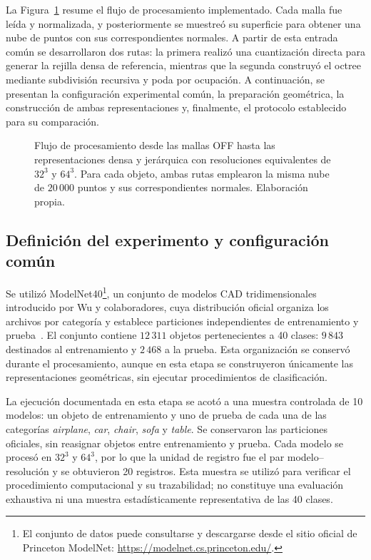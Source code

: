 La Figura~\ref{fig:flujo} resume el flujo de procesamiento implementado. Cada malla fue leída y normalizada, y posteriormente se muestreó su superficie para obtener una nube de puntos con sus correspondientes normales. A partir de esta entrada común se desarrollaron dos rutas: la primera realizó una cuantización directa para generar la rejilla densa de referencia, mientras que la segunda construyó el octree mediante subdivisión recursiva y poda por ocupación. A continuación, se presentan la configuración experimental común, la preparación geométrica, la construcción de ambas representaciones y, finalmente, el protocolo establecido para su comparación.

\begin{figure}[H]\centering
{}
\caption{Flujo de procesamiento desde las mallas OFF hasta las representaciones densa y jerárquica con resoluciones equivalentes de $32^3$ y $64^3$. Para cada objeto, ambas rutas emplearon la misma nube de $20\,000$ puntos y sus correspondientes normales. Elaboración propia.}
\label{fig:flujo}
\end{figure}

\subsection{Definición del experimento y configuración común}
\label{subsec:experimento-inicial}

Se utilizó ModelNet40\footnote{El conjunto de datos puede consultarse y descargarse desde el sitio oficial de Princeton ModelNet: \url{https://modelnet.cs.princeton.edu/}.}, un conjunto de modelos CAD tridimensionales introducido por Wu y colaboradores, cuya distribución oficial organiza los archivos por categoría y establece particiones independientes de entrenamiento y prueba~\parencite{wu2015}. El conjunto contiene $12\,311$ objetos pertenecientes a 40 clases: $9\,843$ destinados al entrenamiento y $2\,468$ a la prueba. Esta organización se conservó durante el procesamiento, aunque en esta etapa se construyeron únicamente las representaciones geométricas, sin ejecutar procedimientos de clasificación.

La ejecución documentada en esta etapa se acotó a una muestra controlada de 10 modelos: un objeto de entrenamiento y uno de prueba de cada una de las categorías \textit{airplane}, \textit{car}, \textit{chair}, \textit{sofa} y \textit{table}. Se conservaron las particiones oficiales, sin reasignar objetos entre entrenamiento y prueba. Cada modelo se procesó en $32^3$ y $64^3$, por lo que la unidad de registro fue el par modelo--resolución y se obtuvieron 20 registros. Esta muestra se utilizó para verificar el procedimiento computacional y su trazabilidad; no constituye una evaluación exhaustiva ni una muestra estadísticamente representativa de las 40 clases.

